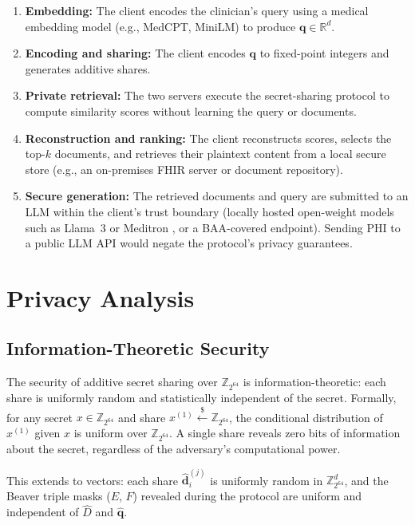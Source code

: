 \documentclass[conference]{IEEEtran}
\newcommand{\Z}{\mathbb{Z}}
\newcommand{\R}{\mathbb{R}}
\newcommand{\query}{\mathbf{q}}
\newcommand{\doc}{\mathbf{d}}
\begin{document}
\begin{enumerate}[leftmargin=*]
\item \textbf{Embedding:} The client encodes the clinician's query using a
    medical embedding model (e.g., MedCPT, MiniLM) to produce
    $\query \in \R^d$.
\item \textbf{Encoding and sharing:} The client encodes $\query$ to
    fixed-point integers and generates additive shares.
\item \textbf{Private retrieval:} The two servers execute the secret-sharing
    protocol to compute similarity scores without learning the query or
    documents.
\item \textbf{Reconstruction and ranking:} The client reconstructs scores,
    selects the top-$k$ documents, and retrieves their plaintext content
    from a local secure store (e.g., an on-premises FHIR server or
    document repository).
\item \textbf{Secure generation:} The retrieved documents and query are
    submitted to an LLM within the client's trust boundary (locally hosted
    open-weight models such as Llama~3 or Meditron \cite{chen2023meditron},
    or a BAA-covered endpoint). Sending PHI to a public LLM API would
    negate the protocol's privacy guarantees.
\end{enumerate}


\section{Privacy Analysis}
\label{sec:privacy}

\subsection{Information-Theoretic Security}
\label{sec:it_security}

The security of additive secret sharing over $\Z_{2^{64}}$ is
information-theoretic: each share is uniformly random and statistically
independent of the secret. Formally, for any secret $x \in \Z_{2^{64}}$
and share $x^{(1)} \xleftarrow{\$} \Z_{2^{64}}$, the conditional distribution
of $x^{(1)}$ given $x$ is uniform over $\Z_{2^{64}}$. A single share reveals
zero bits of information about the secret, regardless of the adversary's
computational power.

This extends to vectors: each share $\hat{\doc}_i^{(j)}$ is uniformly
random in $\Z_{2^{64}}^d$, and the Beaver triple masks ($E$, $F$) revealed
during the protocol are uniform and independent of $\hat{D}$ and
$\hat{\query}$.
\end{document}
